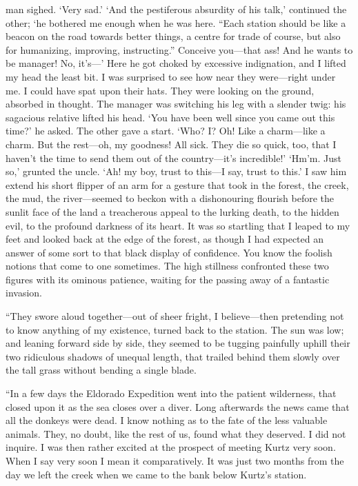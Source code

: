 \documentclass[12pt]{report}
\begin{document}
man sighed. `Very sad.' `And the pestiferous absurdity of his talk,'
continued the other; `he bothered me enough when he was here. ``Each
station should be like a beacon on the road towards better things, a
centre for trade of course, but also for humanizing, improving,
instructing.'' Conceive you---that ass! And he wants to be manager! No,
it's---' Here he got choked by excessive indignation, and I lifted my
head the least bit. I was surprised to see how near they were---right
under me. I could have spat upon their hats. They were looking on the
ground, absorbed in thought. The manager was switching his leg with a
slender twig: his sagacious relative lifted his head. `You have been
well since you came out this time?' he asked. The other gave a start.
`Who? I? Oh! Like a charm---like a charm. But the rest---oh, my
goodness! All sick. They die so quick, too, that I haven't the time to
send them out of the country---it's incredible!' `Hm'm. Just so,'
grunted the uncle. `Ah! my boy, trust to this---I say, trust to this.' I
saw him extend his short flipper of an arm for a gesture that took in
the forest, the creek, the mud, the river---seemed to beckon with a
dishonouring flourish before the sunlit face of the land a treacherous
appeal to the lurking death, to the hidden evil, to the profound
darkness of its heart. It was so startling that I leaped to my feet and
looked back at the edge of the forest, as though I had expected an
answer of some sort to that black display of confidence. You know the
foolish notions that come to one sometimes. The high stillness
confronted these two figures with its ominous patience, waiting for the
passing away of a fantastic invasion.

``They swore aloud together---out of sheer fright, I believe---then
pretending not to know anything of my existence, turned back to the
station. The sun was low; and leaning forward side by side, they seemed
to be tugging painfully uphill their two ridiculous shadows of unequal
length, that trailed behind them slowly over the tall grass without
bending a single blade.

``In a few days the Eldorado Expedition went into the patient
wilderness, that closed upon it as the sea closes over a diver. Long
afterwards the news came that all the donkeys were dead. I know nothing
as to the fate of the less valuable animals. They, no doubt, like the
rest of us, found what they deserved. I did not inquire. I was then
rather excited at the prospect of meeting Kurtz very soon. When I say
very soon I mean it comparatively. It was just two months from the day
we left the creek when we came to the bank below Kurtz's station.
\end{document}
